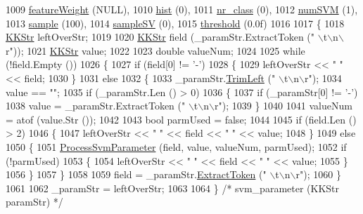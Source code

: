 \begin{DoxyCode}
1009    \hyperlink{struct_s_v_m233_1_1svm__parameter_a1e602e5cf093a3e36d340957656b091b}{featureWeight}   (NULL),
1010    \hyperlink{struct_s_v_m233_1_1svm__parameter_a75623b8d630173a2333f37081e94ff13}{hist}            (0),
1011    \hyperlink{struct_s_v_m233_1_1svm__parameter_a6fa48dd0b10a8f9cbbc8c0d571404345}{nr\_class}        (0),
1012    \hyperlink{struct_s_v_m233_1_1svm__parameter_aac6ce26b15ecd7ce74d86a06982fae07}{numSVM}          (1),
1013    \hyperlink{struct_s_v_m233_1_1svm__parameter_a63dd6c465973afa907155971db828985}{sample}          (100),
1014    \hyperlink{struct_s_v_m233_1_1svm__parameter_a962ae17b97aa2011984e49b4f96aba8b}{sampleSV}        (0),
1015    \hyperlink{struct_s_v_m233_1_1svm__parameter_a7a43eeb6067c4ae3bf32aa151f43195a}{threshold}       (0.0f)
1016 
1017 \{
1018   \hyperlink{class_k_k_b_1_1_k_k_str}{KKStr}  leftOverStr;
1019 
1020   \hyperlink{class_k_k_b_1_1_k_k_str}{KKStr}  field (\_paramStr.ExtractToken (\textcolor{stringliteral}{" \(\backslash\)t\(\backslash\)n\(\backslash\)r"}));
1021   \hyperlink{class_k_k_b_1_1_k_k_str}{KKStr}  value;
1022 
1023   \textcolor{keywordtype}{double}  valueNum;
1024 
1025   \textcolor{keywordflow}{while}  (!field.Empty ())
1026   \{
1027     \textcolor{keywordflow}{if}  (field[0] != \textcolor{charliteral}{'-'})  
1028     \{
1029       leftOverStr << \textcolor{stringliteral}{"  "} << field;
1030     \}
1031     \textcolor{keywordflow}{else}
1032     \{
1033       \_paramStr.\hyperlink{class_k_k_b_1_1_k_k_str_af7c102c53103ddff3f48270b4a198c89}{TrimLeft} (\textcolor{stringliteral}{" \(\backslash\)t\(\backslash\)n\(\backslash\)r"});
1034       value == \textcolor{stringliteral}{""};
1035       \textcolor{keywordflow}{if}  (\_paramStr.Len () > 0)
1036       \{
1037         \textcolor{keywordflow}{if}  (\_paramStr[0] != \textcolor{charliteral}{'-'})
1038           value = \_paramStr.ExtractToken (\textcolor{stringliteral}{" \(\backslash\)t\(\backslash\)n\(\backslash\)r"});
1039       \}
1040 
1041       valueNum = atof (value.Str ()); 
1042 
1043       \textcolor{keywordtype}{bool}  parmUsed = \textcolor{keyword}{false};
1044 
1045       \textcolor{keywordflow}{if}  (field.Len () > 2)
1046       \{
1047         leftOverStr << \textcolor{stringliteral}{"  "} << field << \textcolor{stringliteral}{" "} << value;
1048       \}
1049       \textcolor{keywordflow}{else}
1050       \{
1051         \hyperlink{struct_s_v_m233_1_1svm__parameter_ab5a7c97ba6772210f6071400dfae48db}{ProcessSvmParameter} (field, value, valueNum, parmUsed);
1052         \textcolor{keywordflow}{if}  (!parmUsed) 
1053         \{
1054           leftOverStr << \textcolor{stringliteral}{"  "} << field << \textcolor{stringliteral}{" "} << value;
1055         \}  
1056       \}
1057     \}
1058  
1059     field = \_paramStr.\hyperlink{class_k_k_b_1_1_k_k_str_acc31c95308d6d699debde883c11e5802}{ExtractToken} (\textcolor{stringliteral}{" \(\backslash\)t\(\backslash\)n\(\backslash\)r"});
1060   \} 
1061 
1062   \_paramStr = leftOverStr;
1063   
1064 \}  \textcolor{comment}{/* svm\_parameter (KKStr  paramStr) */}
\end{DoxyCode}


